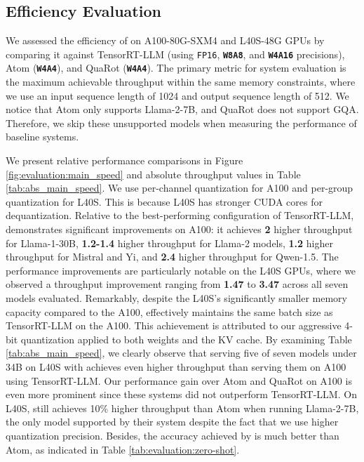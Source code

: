 








\subsection{Efficiency Evaluation}

We assessed the efficiency of \system on A100-80G-SXM4 and L40S-48G GPUs by comparing it against TensorRT-LLM (using \texttt{FP16}, \textbf{\texttt{W8A8}}, and \textbf{\texttt{W4A16}} precisions), Atom (\textbf{\texttt{W4A4}}), and QuaRot (\textbf{\texttt{W4A4}}). The primary metric for system evaluation is the maximum achievable throughput within the same memory constraints, where we use an input sequence length of 1024 and output sequence length of 512. We notice that Atom only supports Llama-2-7B, and QuaRot does not support GQA. Therefore, we skip these unsupported models when measuring the performance of baseline systems. 

We present relative performance comparisons in Figure \ref{fig:evaluation:main_speed} and absolute throughput values in Table \ref{tab:abs_main_speed}. We use per-channel quantization for A100 and per-group quantization for L40S. This is because L40S has stronger CUDA cores for dequantization. Relative to the best-performing configuration of TensorRT-LLM, \system demonstrates significant improvements on A100: it achieves \textbf{2\x} higher throughput for Llama-1-30B, \textbf{1.2-1.4\x} higher throughput for Llama-2 models, \textbf{1.2\x} higher throughput for Mistral and Yi, and \textbf{2.4\x} higher throughput for Qwen-1.5. The performance improvements are particularly notable on the L40S GPUs, where we observed a throughput improvement ranging from \textbf{1.47\x} to \textbf{3.47\x} across all seven models evaluated. Remarkably, despite the L40S's significantly smaller memory capacity compared to the A100, \system effectively maintains the same batch size as TensorRT-LLM on the A100. This achievement is attributed to our aggressive 4-bit quantization applied to both weights and the KV cache. By examining Table \ref{tab:abs_main_speed}, we clearly observe that serving five of seven models under 34B on L40S with \system achieves even higher throughput than serving them on A100 using TensorRT-LLM. Our performance gain over Atom and QuaRot on A100 is even more prominent since these systems did not outperform TensorRT-LLM. On L40S, \system still achieves 10\% higher throughput than Atom when running Llama-2-7B, the only model supported by their system despite the fact that we use higher quantization precision. Besides, the accuracy achieved by \system is much better than Atom, as indicated in Table \ref{tab:evaluation:zero-shot}.

